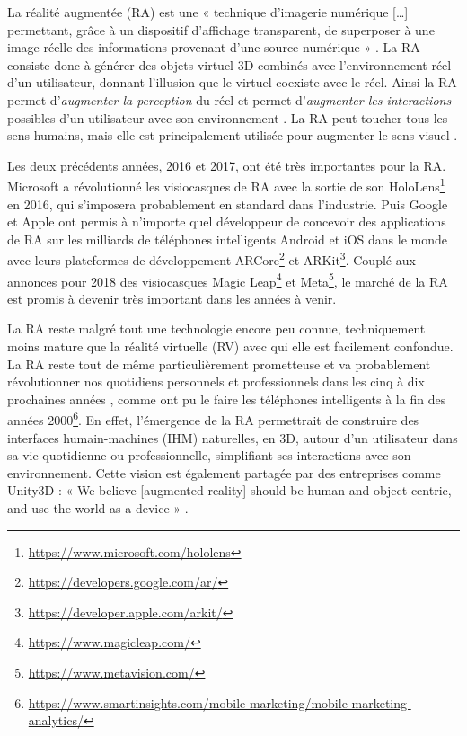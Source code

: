 La réalité augmentée (RA) est une « technique d'imagerie numérique […] permettant, grâce à un dispositif d'affichage transparent, de superposer à une image réelle des informations provenant d'une source numérique » \citep{OfficeQuebecoisLangueFrancaiseRA2015}. La RA consiste donc à générer des objets virtuel 3D combinés avec l'environnement réel d'un utilisateur, donnant l'illusion que le virtuel coexiste avec le réel. Ainsi la RA permet d'\emph{augmenter la perception} du réel et permet d'\emph{augmenter les interactions} possibles d'un utilisateur avec son environnement \citep{Azuma1997}. La RA peut toucher tous les sens humains, mais elle est principalement utilisée pour augmenter le sens visuel .

Les deux précédents années, 2016 et 2017, ont été très importantes pour la RA. Microsoft a révolutionné les visiocasques de RA avec la sortie de son HoloLens\footnote{\url{https://www.microsoft.com/hololens}} en 2016, qui s'imposera probablement en standard dans l'industrie. Puis Google et Apple ont permis à n'importe quel développeur de concevoir des applications de RA sur les milliards de téléphones intelligents Android et iOS dans le monde avec leurs plateformes de développement ARCore\footnote{\url{https://developers.google.com/ar/}} et ARKit\footnote{\url{https://developer.apple.com/arkit/}}. Couplé aux annonces pour 2018 des visiocasques Magic Leap\footnote{\url{https://www.magicleap.com/}} et Meta\footnote{\url{https://www.metavision.com/}}, le marché de la RA est promis à devenir très important dans les années à venir.



La RA reste malgré tout une technologie encore peu connue, techniquement moins mature que la réalité virtuelle (RV) avec qui elle est facilement confondue. La RA reste tout de même particulièrement prometteuse et va probablement révolutionner nos quotidiens personnels et professionnels dans les cinq à dix prochaines années , comme ont pu le faire les téléphones intelligents à la fin des années 2000\footnote{\url{https://www.smartinsights.com/mobile-marketing/mobile-marketing-analytics/}}. En effet, l'émergence de la RA permettrait de construire des interfaces humain-machines (IHM) naturelles, en 3D, autour d'un utilisateur dans sa vie quotidienne ou professionnelle, simplifiant ses interactions avec son environnement. Cette vision est également partagée par des entreprises comme Unity3D : « We believe [augmented reality] should be human and object centric, and use the world as a device » \citep{UnityFutureMRPartIII2017}.

